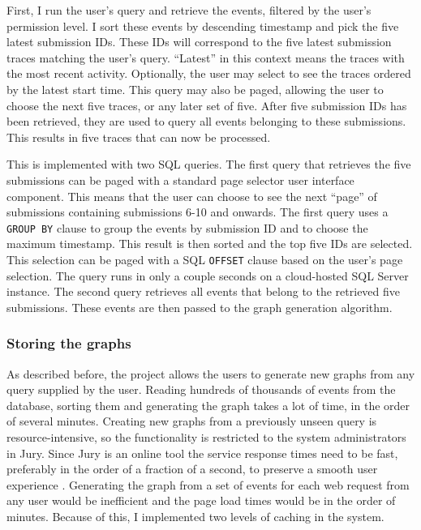 First, I run the user's query and retrieve the events, filtered by the user's permission level.
I sort these events by descending timestamp and pick the five latest submission IDs.
These IDs will correspond to the five latest submission traces matching the user's query.
``Latest'' in this context means the traces with the most recent activity.
Optionally, the user may select to see the traces ordered by the latest start time.
This query may also be paged, allowing the user to choose the next five traces, or any later set of five.
After five submission IDs has been retrieved, they are used to query all events belonging to these submissions. This results in five traces that can now be processed.

This is implemented with two SQL queries.
The first query that retrieves the five submissions can be paged with a standard page selector user interface component.
This means that the user can choose to see the next ``page'' of submissions containing submissions 6-10 and onwards.
The first query uses a \texttt{GROUP BY} clause to group the events by submission ID and to choose the maximum timestamp.
This result is then sorted and the top five IDs are selected.
This selection can be paged with a SQL \texttt{OFFSET} clause based on the user's page selection.
The query runs in only a couple seconds on a cloud-hosted SQL Server instance.
The second query retrieves all events that belong to the retrieved five submissions.
These events are then passed to the graph generation algorithm.

\subsubsection{Storing the graphs}
\label{storinggraphs}

As described before, the project allows the users to generate new graphs from any query supplied by the user.
Reading hundreds of thousands of events from the database, sorting them and generating the graph takes a lot of time, in the order of several minutes.
Creating new graphs from a previously unseen query is resource-intensive, so the functionality is restricted to the system administrators in Jury. 
Since Jury is an online tool the service response times need to be fast, preferably in the order of a fraction of a second, to preserve a smooth user experience .
Generating the graph from a set of events for each web request from any user would be inefficient and the page load times would be in the order of minutes.
Because of this, I implemented two levels of caching in the system.

